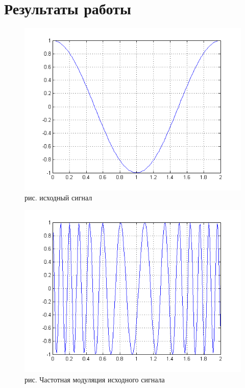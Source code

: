 \documentclass[10pt,a4paper]{report}
\begin{document}
\section{Результаты работы}
\begin{figure}
\begin{center}
\includegraphics[width=150mm, scale = 0.9]{8_1}\newline
рис. исходный сигнал\newline
\end{center}
\end{figure}
\begin{figure}
\begin{center}
\includegraphics[width=150mm, scale = 0.9]{8_2}\newline
рис. Частотная модуляция исходного сигнала\newline
\end{center}
\end{figure}
\end{document}
